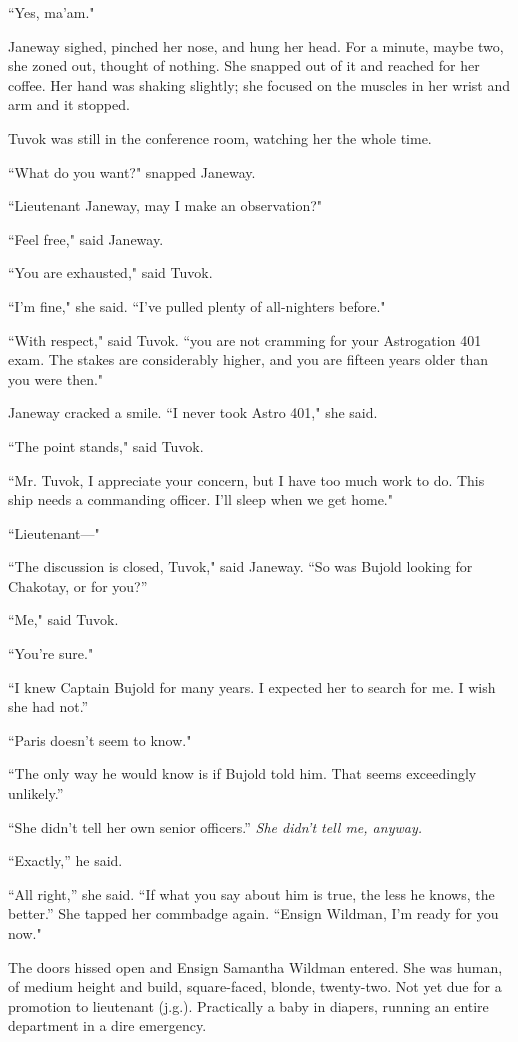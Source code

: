 \documentclass[twoside,letterpaper,12pt]{memoir}
\begin{document}
``Yes, ma'am."

Janeway sighed, pinched her nose, and hung her head. For a minute, maybe two, she zoned out, thought of nothing. She snapped out of it and reached for her coffee. Her hand was shaking slightly; she focused on the muscles in her wrist and arm and it stopped.

Tuvok was still in the conference room, watching her the whole time.

``What do you want?" snapped Janeway.

``Lieutenant Janeway, may I make an observation?"

``Feel free," said Janeway.

``You are exhausted," said Tuvok.

``I'm fine," she said. ``I've pulled plenty of all-nighters before."

``With respect," said Tuvok. ``you are not cramming for your Astrogation 401 exam. The stakes are considerably higher, and you are fifteen years older than you were then."

Janeway cracked a smile. ``I never took Astro 401," she said.

``The point stands," said Tuvok.

``Mr. Tuvok, I appreciate your concern, but I have too much work to do. This ship needs a commanding officer. I'll sleep when we get home."

``Lieutenant---"

``The discussion is closed, Tuvok," said Janeway. ``So was Bujold looking for Chakotay, or for you?''

``Me," said Tuvok.

``You're sure."

``I knew Captain Bujold for many years. I expected her to search for me. I wish she had not.''

``Paris doesn't seem to know."

``The only way he would know is if Bujold told him. That seems exceedingly unlikely.''

``She didn’t tell her own senior officers.'' \textit{She didn’t tell me, anyway.}

``Exactly,'' he said.

``All right,'' she said. ``If what you say about him is true, the less he knows, the better.'' She tapped her commbadge again. ``Ensign Wildman, I'm ready for you now."

The doors hissed open and Ensign Samantha Wildman entered. She was human, of medium height and build, square-faced, blonde, twenty-two. Not yet due for a promotion to lieutenant (j.g.). Practically a baby in diapers, running an entire department in a dire emergency.
\end{document}
